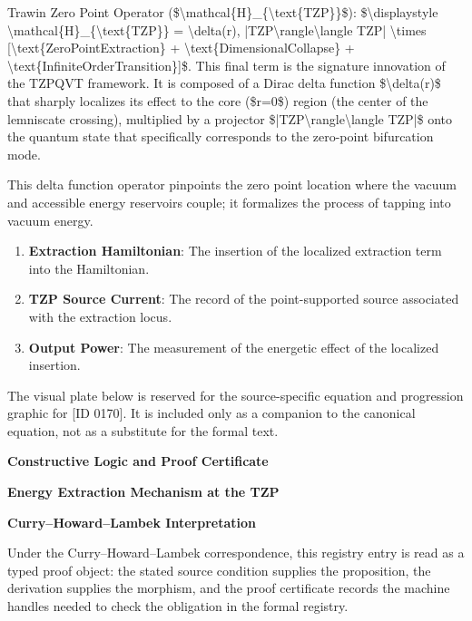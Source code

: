 Trawin Zero Point Operator (\$\textbackslash{}mathcal\{H\}\_\{\textbackslash{}text\{TZP\}\}\$): \$\textbackslash{}displaystyle \textbackslash{}mathcal\{H\}\_\{\textbackslash{}text\{TZP\}\} = \textbackslash{}delta(r), |TZP\textbackslash{}rangle\textbackslash{}langle TZP| \textbackslash{}times [\textbackslash{}text\{ZeroPointExtraction\} + \textbackslash{}text\{DimensionalCollapse\} + \textbackslash{}text\{InfiniteOrderTransition\}]\$. This final term is the signature innovation of the TZPQVT framework. It is composed of a Dirac delta function \$\textbackslash{}delta(r)\$ that sharply localizes its effect to the core (\$r=0\$) region (the center of the lemniscate crossing), multiplied by a projector \$|TZP\textbackslash{}rangle\textbackslash{}langle TZP|\$ onto the quantum state that specifically corresponds to the zero-point bifurcation mode.

This delta function operator pinpoints the zero point location where the vacuum and accessible energy reservoirs couple; it formalizes the process of tapping into vacuum energy.
\endgroup

\begin{enumerate}[leftmargin=1.6em,itemsep=6pt,topsep=4pt]
\item \textbf{Extraction Hamiltonian}: The insertion of the localized extraction term into the Hamiltonian.
\item \textbf{TZP Source Current}: The record of the point-supported source associated with the extraction locus.
\item \textbf{Output Power}: The measurement of the energetic effect of the localized insertion.
\end{enumerate}

\begingroup\footnotesize\sloppy
The visual plate below is reserved for the source-specific equation and progression graphic for [ID 0170]. It is included only as a companion to the canonical equation, not as a substitute for the formal text.
\par\endgroup
\ifTZPDarkEdition
{}
\fi

\clearpage
\begingroup\tzpsupportsetup
\noindent\textbf{\fontsize{10.8pt}{12.8pt}\selectfont [ID 0170] Constructive Logic and Proof Certificate}\par
\noindent\textbf{\fontsize{10pt}{12pt}\selectfont Energy Extraction Mechanism at the TZP}\par
\vspace{0.45em}
\begingroup
\footnotesize
\setlength{\parskip}{0.22em}
\setlength{\parindent}{0pt}
\noindent\textbf{Curry--Howard--Lambek Interpretation}\par
Under the Curry--Howard--Lambek correspondence, this registry entry is read as a typed proof
object: the stated source condition supplies the proposition, the derivation supplies the
morphism, and the proof certificate records the machine handles needed to check the obligation
in the formal registry.


